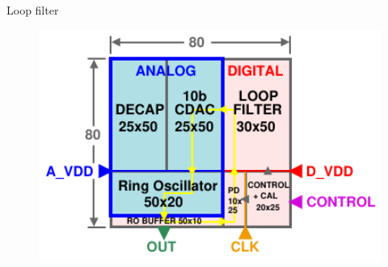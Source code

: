 \documentclass[t, screen, aspectratio=43]{beamer}
\begin{document}
\begin{frame}
\begin{block}{Loop filter}
\begin{minipage}{6cm}
		\end{minipage}%
		\begin{minipage}{6cm}
			\begin{figure}[htb!]
			        \centering
			        \includegraphics[width=1\textwidth, angle=0]{pll_floorplan}
			\end{figure}
		\end{minipage}%

	\end{block}	
\end{frame}
\end{document}
